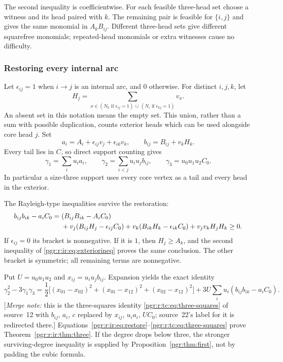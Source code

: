 \documentclass[11pt]{article}
\numberwithin{equation}{section}
\theoremstyle{definition}\newtheorem{definition}[theorem]{Definition}\newtheorem{remark}[theorem]{Remark}
\newcommand{\mnote}[1]{[\textit{Merge note:} #1]}
\begin{document}
The second inequality is coefficientwise. For each feasible three-head set choose a witness and its head paired with $k$. The remaining pair is feasible for $\{i,j\}$ and gives the same monomial in $A_k B_{ij}$. Different three-head sets give different squarefree monomials; repeated-head monomials or extra witnesses cause no difficulty.

\subsubsection{Restoring every internal arc}
Let $\epsilon_{ij}=1$ when $i\to j$ is an internal arc, and $0$ otherwise. For distinct $i,j,k$, let
\[
 H_j=\sum_{x\in (N_k\text{ if }\epsilon_{ij}=1)\,\cup\,(N_i\text{ if }\epsilon_{kj}=1)}v_x.
\]
An absent set in this notation means the empty set. This union, rather than a sum with possible duplication, counts exterior heads which can be used alongside core head $j$. Set
\[
 a_i=A_i+\epsilon_{ij}v_j+\epsilon_{ik}v_k,
 \qquad b_{ij}=B_{ij}+v_kH_k.
\]
Every tail lies in $C$, so direct support counting gives
\begin{equation}\label{pgr:r:ir:eq:threecoeff}
 \gamma_1=\sum_i u_i a_i,
 \qquad \gamma_2=\sum_{i<j}u_i u_j b_{ij},
 \qquad \gamma_3=u_0u_1u_2C_0.
\end{equation}
In particular a size-three support uses every core vertex as a tail and every head in the exterior.

The Rayleigh-type inequalities survive the restoration:
\begin{align}\label{pgr:r:ir:eq:restore}
 b_{ij}b_{ik}-a_iC_0={}&(B_{ij}B_{ik}-A_iC_0)\notag\\
 &+v_j(B_{ij}H_j-\epsilon_{ij}C_0)
 +v_k(B_{ik}H_k-\epsilon_{ik}C_0)+v_jv_kH_jH_k\ge0.
\end{align}
If $\epsilon_{ij}=0$ its bracket is nonnegative. If it is $1$, then $H_j\ge A_k$, and the second inequality of \eqref{pgr:r:ir:eq:exteriorineq} proves the same conclusion. The other bracket is symmetric; all remaining terms are nonnegative.

Put $U=u_0u_1u_2$ and $x_{ij}=u_i u_jb_{ij}$. Expansion yields the exact identity
\[
 \gamma_2^2-3\gamma_1\gamma_3
 =\frac12\bigl[(x_{01}-x_{02})^2+(x_{01}-x_{12})^2+(x_{02}-x_{12})^2\bigr]
 +3U\sum_i u_i(b_{ij}b_{ik}-a_iC_0).
\]
\mnote{this is the three-squares identity \eqref{pgr:r:tc:eq:three-squares}
of source~12 with $b_{ij}$, $a_i$, $c$ replaced by $x_{ij}$, $u_ia_i$,
$UC_0$; source~22's label for it is redirected there.}
Equations~\eqref{pgr:r:ir:eq:restore}--\eqref{pgr:r:tc:eq:three-squares} prove Theorem~\ref{pgr:r:ir:thm:three}. If the degree drops below three, the stronger surviving-degree inequality is supplied by Proposition~\ref{pgr:thm:first}, not by padding the cubic formula.
\end{document}
